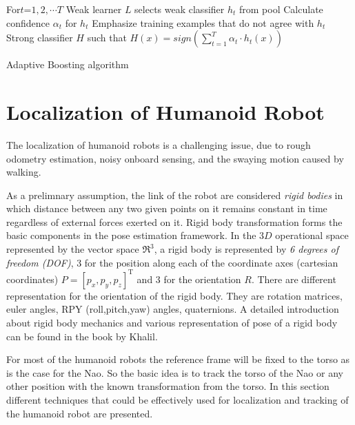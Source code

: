 \begin{algorithm}[H]
 \label{alg:adaboost}
For{$t$=$1,2,\cdots T$}{
	Weak learner $L$ selects weak classifier $h_t$ from pool\;
	Calculate confidence $\alpha_t$ for $h_t$\;
	Emphasize training examples that do not agree with $h_t$\;
}
\Return Strong classifier $H$ such that $H(x)=sign(\sum_{t=1}^{T}\alpha_t\cdot h_t(x))$
 \caption{Adaptive Boosting algorithm}
\end{algorithm}

\section{Localization of Humanoid Robot} %

		The localization of humanoid robots is a challenging issue, due to rough odometry estimation, noisy onboard sensing, and the swaying motion caused by walking\cite{Cervera2012}. 
		 
		As a prelimnary assumption, the link of the robot are considered \emph{rigid bodies} in which distance between any two given points on it remains constant in time regardless of external forces exerted on it. Rigid body transformation forms the basic components in the pose estimation framework. In the $3D$ operational space represented by the vector space $\Re^3$, a rigid body is represented by \emph{6 degrees of freedom (DOF)}, 3 for the position along each of the coordinate axes (cartesian coordinates) $P = [p_x,p_y,p_z]^{\text{T}}$ and 3 for the orientation $R$. There are different representation for the orientation of the rigid body. They are rotation matrices, euler angles, RPY (roll,pitch,yaw) angles, quaternions. A detailed introduction about rigid body mechanics and various representation of pose of a rigid body can be found in the book by Khalil\cite{Khalil2002}.
		
		For most of the humanoid robots the reference frame will be fixed to the torso as is the case for the Nao. So the basic idea is to track the torso of the Nao or any other position with the known transformation from the torso. In this section different techniques that could be effectively used for localization and tracking of the humanoid robot are presented.
